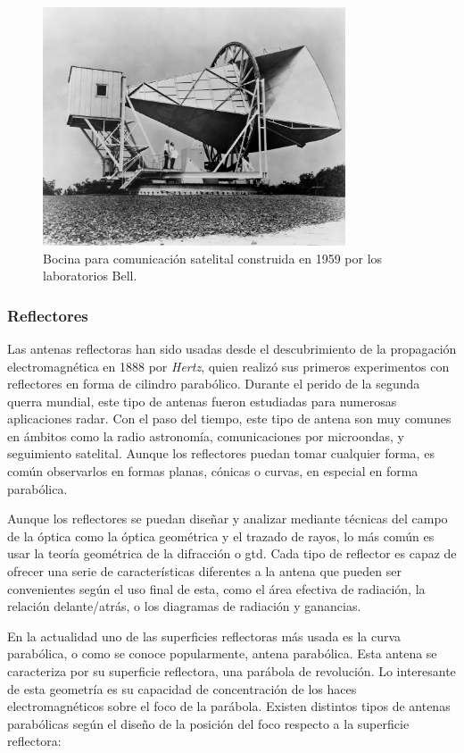 \begin{figure}[h]
    \centering
        \includegraphics[width=0.8\textwidth]{archivos/horn}
        \caption{Bocina para comunicación satelital construida en 1959 por los laboratorios Bell. \cite{NASA1962}}
        \label{fig:horn}
\end{figure}

\subsubsection{Reflectores}

\par Las antenas reflectoras han sido usadas desde el descubrimiento de la propagación electromagnética en 1888 por \textit{Hertz}, quien realizó sus primeros experimentos con reflectores en forma de cilindro parabólico. Durante el perido de la segunda querra mundial, este tipo de antenas fueron estudiadas para numerosas aplicaciones radar. Con el paso del tiempo, este tipo de antena son muy comunes en ámbitos como la radio astronomía, comunicaciones por microondas, y seguimiento satelital. Aunque los reflectores puedan tomar cualquier forma, es común observarlos en formas planas, cónicas o curvas, en especial en forma parabólica. 
\\
\par Aunque los reflectores se puedan diseñar y analizar mediante técnicas del campo de la óptica como la óptica geométrica y el trazado de rayos, lo más común es usar la teoría geométrica de la difracción o \gls{gtd}. Cada tipo de reflector es capaz de ofrecer una serie de características diferentes a la antena que pueden ser convenientes según el uso final de esta, como el área efectiva de radiación, la relación delante/atrás, o los diagramas de radiación y ganancias.
\\
\par En la actualidad uno de las superficies reflectoras más usada es la curva parabólica, o como se conoce popularmente, antena parabólica. Esta antena se caracteriza por su superficie reflectora, una parábola de revolución. Lo interesante de esta geometría es su capacidad de concentración de los haces electromagnéticos sobre el foco de la parábola. Existen distintos tipos de antenas parabólicas según el diseño de la posición del foco respecto a la superficie reflectora:

